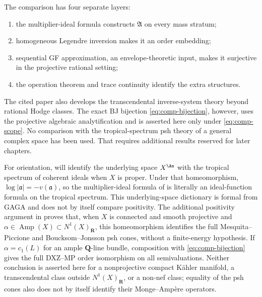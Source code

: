The comparison has four separate layers:
\begin{enumerate}
\item the multiplier-ideal formula constructs $\mathfrak A$ on every
mass stratum;
\item homogeneous Legendre inversion makes it an order embedding;
\item sequential GF approximation, an envelope-theoretic input, makes it
surjective in the projective rational setting;
\item the operation theorem and trace continuity identify the extra
structures.
\end{enumerate}

The cited paper \cite{DXZ23} also develops the transcendental inverse-system
theory beyond rational Hodge classes.
The exact BJ bijection \eqref{eq:comp-bijection}, however, uses the
projective algebraic analytification and is asserted here only under
\eqref{eq:comp-scope}.
No comparison with the tropical-spectrum psh theory of a general complex
space has been used.
That requires additional results reserved for later chapters.

For orientation,  will identify the
underlying space $X^{\An}$ with the tropical spectrum of coherent ideals
when $X$ is proper.  Under that homeomorphism,
$\log|\mathfrak a|=-v(\mathfrak a)$, so the multiplier-ideal formula of
 is literally an ideal-function formula on
the tropical spectrum.  This underlying-space dictionary is formal from
GAGA and does not by itself compare positivity.  The additional positivity
argument in  proves that, when $X$
is connected and smooth projective and
$\alpha\in\operatorname{Amp}(X)\subset N^1(X)_{\mathbf R}$, this
homeomorphism identifies the full Mesquita--Piccione and
Boucksom--Jonsson psh cones, without a finite-energy hypothesis.  If
$\alpha=c_1(L)$ for an ample $\mathbf Q$-line bundle, composition with
\eqref{eq:comp-bijection} gives the full DXZ--MP order isomorphism on all
semivaluations.  Neither conclusion is asserted here for a nonprojective
compact K\"ahler manifold, a transcendental class outside
$N^1(X)_{\mathbf R}$, or a non-nef class; equality of the psh cones also
does not by itself identify their Monge--Amp\`ere operators.


